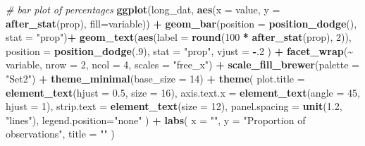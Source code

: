 \documentclass[
]{article}
\newenvironment{Shaded}{\begin{snugshade}}{\end{snugshade}}
\newcommand{\AttributeTok}[1]{\textcolor[rgb]{0.13,0.29,0.53}{#1}}
\newcommand{\CommentTok}[1]{\textcolor[rgb]{0.56,0.35,0.01}{\textit{#1}}}
\newcommand{\DecValTok}[1]{\textcolor[rgb]{0.00,0.00,0.81}{#1}}
\newcommand{\FloatTok}[1]{\textcolor[rgb]{0.00,0.00,0.81}{#1}}
\newcommand{\FunctionTok}[1]{\textcolor[rgb]{0.13,0.29,0.53}{\textbf{#1}}}
\newcommand{\NormalTok}[1]{#1}
\newcommand{\SpecialCharTok}[1]{\textcolor[rgb]{0.81,0.36,0.00}{\textbf{#1}}}
\newcommand{\StringTok}[1]{\textcolor[rgb]{0.31,0.60,0.02}{#1}}
\begin{document}
\begin{Shaded}
\begin{Highlighting}[]
\CommentTok{\# bar plot of percentages}
\FunctionTok{ggplot}\NormalTok{(long\_dat, }\FunctionTok{aes}\NormalTok{(}\AttributeTok{x =}\NormalTok{ value, }\AttributeTok{y =} \FunctionTok{after\_stat}\NormalTok{(prop), }\AttributeTok{fill=}\NormalTok{variable)) }\SpecialCharTok{+}
  \FunctionTok{geom\_bar}\NormalTok{(}\AttributeTok{position =} \FunctionTok{position\_dodge}\NormalTok{(), }\AttributeTok{stat =} \StringTok{"prop"}\NormalTok{)}\SpecialCharTok{+}
  \FunctionTok{geom\_text}\NormalTok{(}\FunctionTok{aes}\NormalTok{(}\AttributeTok{label =} \FunctionTok{round}\NormalTok{(}\DecValTok{100} \SpecialCharTok{*} \FunctionTok{after\_stat}\NormalTok{(prop), }\DecValTok{2}\NormalTok{)),}
    \AttributeTok{position =} \FunctionTok{position\_dodge}\NormalTok{(.}\DecValTok{9}\NormalTok{), }\AttributeTok{stat =} \StringTok{"prop"}\NormalTok{, }\AttributeTok{vjust =} \SpecialCharTok{{-}}\NormalTok{.}\DecValTok{2}
\NormalTok{  ) }\SpecialCharTok{+} 
  \FunctionTok{facet\_wrap}\NormalTok{(}\SpecialCharTok{\textasciitilde{}}\NormalTok{ variable, }\AttributeTok{nrow =} \DecValTok{2}\NormalTok{, }\AttributeTok{ncol =} \DecValTok{4}\NormalTok{, }\AttributeTok{scales =} \StringTok{"free\_x"}\NormalTok{) }\SpecialCharTok{+}
  \FunctionTok{scale\_fill\_brewer}\NormalTok{(}\AttributeTok{palette =} \StringTok{"Set2"}\NormalTok{) }\SpecialCharTok{+}
  \FunctionTok{theme\_minimal}\NormalTok{(}\AttributeTok{base\_size =} \DecValTok{14}\NormalTok{) }\SpecialCharTok{+}
  \FunctionTok{theme}\NormalTok{(}
    \AttributeTok{plot.title =} \FunctionTok{element\_text}\NormalTok{(}\AttributeTok{hjust =} \FloatTok{0.5}\NormalTok{, }\AttributeTok{size =} \DecValTok{16}\NormalTok{),}
    \AttributeTok{axis.text.x =} \FunctionTok{element\_text}\NormalTok{(}\AttributeTok{angle =} \DecValTok{45}\NormalTok{, }\AttributeTok{hjust =} \DecValTok{1}\NormalTok{),}
    \AttributeTok{strip.text =} \FunctionTok{element\_text}\NormalTok{(}\AttributeTok{size =} \DecValTok{12}\NormalTok{),}
    \AttributeTok{panel.spacing =} \FunctionTok{unit}\NormalTok{(}\FloatTok{1.2}\NormalTok{, }\StringTok{"lines"}\NormalTok{),}
    \AttributeTok{legend.position=}\StringTok{"none"}
\NormalTok{  ) }\SpecialCharTok{+}
  \FunctionTok{labs}\NormalTok{(}
    \AttributeTok{x =} \StringTok{""}\NormalTok{,}
    \AttributeTok{y =} \StringTok{"Proportion of observations"}\NormalTok{,}
    \AttributeTok{title =} \StringTok{""}
\NormalTok{  )}
\end{Highlighting}
\end{Shaded}
\end{document}
